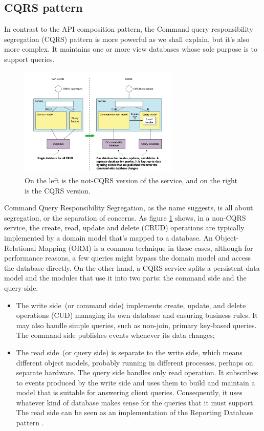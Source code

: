 \documentclass[conference]{IEEEtran}
\begin{document}
\subsection{CQRS pattern}

In contrast to the API composition pattern, the Command query responsibility segregation (CQRS) pattern \cite{cqrs-fowler} is more powerful as we shall explain, but it's also more complex. It maintains one or more view databases whose sole purpose is to support queries.

\begin{figure}[!htbp]
\centering
\includegraphics[width=3in]{jpeg/cqrs}
\caption{On the left is the not-CQRS version of the service, and on the right is the CQRS version. \cite{microservices-patterns-cqrs}}
\label{cqrs}
\end{figure}

Command Query Responsibility Segregation, as the name suggests, is all about segregation, or the separation of concerns. As figure \ref{cqrs} shows, in a non-CQRS service, the create, read, update and delete (CRUD) operations are typically implemented by a domain model that’s mapped to a database. An Object-Relational Mapping (ORM) \cite{orm} is a common technique in these cases, although for performance reasons, a few queries might bypass the domain model and access the database directly. On the other hand, a CQRS service splits a persistent data model and the modules that use it into two parts: the command side and the query side.

\begin{itemize}
  \item The write side (or command side) implements create, update, and delete operations (CUD) managing its own database and ensuring business rules. It may also handle simple queries, such as non-join, primary key-based queries. The command side publishes events whenever its data changes;
  \item The read side (or query side) is separate to the write side, which means different object models, probably running in different processes, perhaps on separate hardware. The query side handles only read operation. It subscribes to events produced by the write side and uses them to build and maintain a model that is suitable for answering client queries. Consequently, it uses whatever kind of database makes sense for the queries that it must support. The read side can be seen as an implementation of the Reporting Database pattern \cite{reporting-database}.
\end{itemize}
\end{document}
